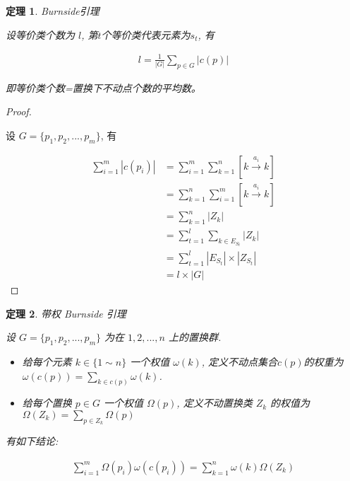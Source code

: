 \documentclass{ctexart}
\newtheorem{theorem}{定理}[section]  %
\begin{document}
\begin{theorem} Burnside引理
    
    设等价类个数为 $l$, 第$t$个等价类代表元素为$s_t$, 有
    
    \begin{align*}
        l = \frac{1}{|G|}\sum_{p \in G}|c(p)|
    \end{align*}

    即等价类个数=置换下不动点个数的平均数。
\end{theorem}

\begin{proof}\ 

    设 $G=\{p_1,p_2,...,p_m\}$, 有

    \begin{align*}
        \sum_{i=1}^{m}|c(p_i)| &= \sum_{i=1}^{m}\sum_{k=1}^{n} [k \xrightarrow{a_i} k] \\
                             &= \sum_{k=1}^{n}\sum_{i=1}^{m} [k \xrightarrow{a_i} k] \\
                             &= \sum_{k=1}^{n} |Z_k|\\
                             &= \sum_{t=1}^{l} \sum_{k\in E_{S_t}} |Z_k|\\
                             &= \sum_{t=1}^{l} |E_{S_t}|\times|Z_{S_t}|\\
                             &= l \times |G|
    \end{align*}
\end{proof}

\begin{theorem} 带权 Burnside 引理
    
    
    设 $G=\{p_1,p_2,...,p_m\}$ 为在 $1,2,...,n$ 上的置换群.

    \begin{itemize}
        \item 给每个元素 $k \in \{1\sim n\}$ 一个权值 $\omega(k)$, 定义不动点集合$c(p)$的权重为$\omega(c(p)) = \sum_{k\in c(p)} \omega(k)$.
        \item 给每个置换 $p \in G$ 一个权值 $\Omega(p)$, 定义不动置换类 $Z_k$ 的权值为 $\Omega(Z_k) = \sum_{p \in Z_k} \Omega(p)$
    \end{itemize}

    有如下结论:

    \begin{align*}
        \sum_{i=1}^{m}\Omega(p_i)\omega(c(p_i)) = \sum_{k=1}^{n}\omega(k)\Omega(Z_k)
    \end{align*}

\end{theorem}
\end{document}
